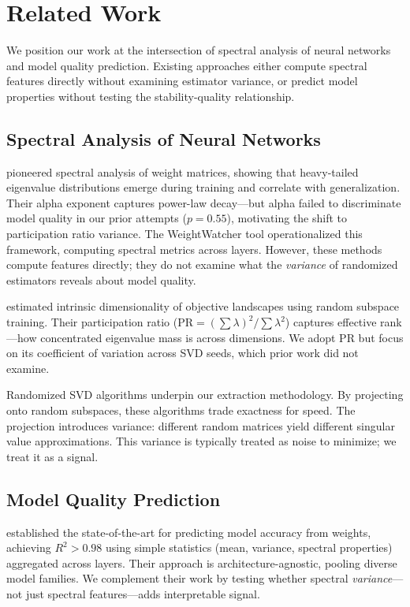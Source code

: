 \section{Related Work}
\label{sec:related}

We position our work at the intersection of spectral analysis of neural networks and model quality prediction. Existing approaches either compute spectral features directly without examining estimator variance, or predict model properties without testing the stability-quality relationship.

\subsection{Spectral Analysis of Neural Networks}

\citet{martin2019traditional} pioneered spectral analysis of weight matrices, showing that heavy-tailed eigenvalue distributions emerge during training and correlate with generalization. Their alpha exponent captures power-law decay---but alpha failed to discriminate model quality in our prior attempts ($p = 0.55$), motivating the shift to participation ratio variance. The WeightWatcher tool \citep{martin2021predicting} operationalized this framework, computing spectral metrics across layers. However, these methods compute features directly; they do not examine what the \emph{variance} of randomized estimators reveals about model quality.

\citet{li2018measuring} estimated intrinsic dimensionality of objective landscapes using random subspace training. Their participation ratio ($\text{PR} = (\sum\lambda)^2 / \sum\lambda^2$) captures effective rank---how concentrated eigenvalue mass is across dimensions. We adopt PR but focus on its coefficient of variation across SVD seeds, which prior work did not examine.

Randomized SVD algorithms \citep{halko2011finding} underpin our extraction methodology. By projecting onto random subspaces, these algorithms trade exactness for speed. The projection introduces variance: different random matrices yield different singular value approximations. This variance is typically treated as noise to minimize; we treat it as a signal.

\subsection{Model Quality Prediction}

\citet{unterthiner2020predicting} established the state-of-the-art for predicting model accuracy from weights, achieving $R^2 > 0.98$ using simple statistics (mean, variance, spectral properties) aggregated across layers. Their approach is architecture-agnostic, pooling diverse model families. We complement their work by testing whether spectral \emph{variance}---not just spectral features---adds interpretable signal.

